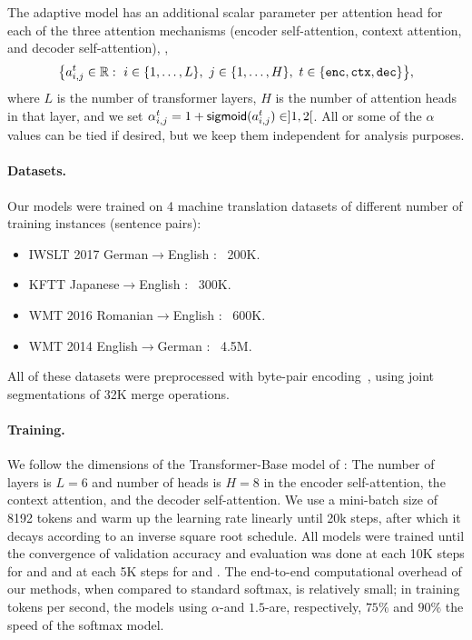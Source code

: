 The adaptive model has an additional scalar parameter per attention
head for each of the three attention mechanisms (encoder
self-attention, context attention, and decoder self-attention), \ie,
\begin{equation}
    \big \{ a_{i,j}^{t} \in \mathbb{R}:~
    i \in \{1, \dots, L\},~
    j \in \{1, \dots, H\},~
    t \in \{\texttt{enc}, \texttt{ctx}, \texttt{dec}\} \big\},
\end{equation}
where $L$ is the number of transformer layers, $H$ is the number of attention heads in that layer,
and we set $\alpha_{i,j}^t = 1 + \operatorname*{\mathsf{sigmoid}}(a_{i,j}^t) \in ]1, 2[$.
All or some of the $\alpha$ values can be tied if desired, but we
keep them independent for analysis purposes.

\paragraph*{Datasets.} Our models were trained on 4 machine
translation datasets of different number of training instances
(sentence pairs):

\begin{itemize}[itemsep=.5ex,leftmargin=2ex]
    \item IWSLT 2017 German$\rightarrow$English
          \citep[,][]{cettolooverview}: ~200K.
    \item KFTT Japanese$\rightarrow$English
          \citep[,][]{neubig11kftt}: ~300K.
    \item WMT 2016 Romanian$\rightarrow$English
          \citep[,][]{bojar2016findings}: ~600K.
    \item WMT 2014 English$\rightarrow$German
          \citep[,][]{bojar2014findings}: ~4.5M.
\end{itemize}

All of these datasets were preprocessed with byte-pair
encoding~\citep[BPE;][]{sennrich2016neural}, using joint
segmentations of 32K merge operations.

\paragraph*{Training.}
We follow the dimensions of the Transformer-Base model of
\citet{vaswani2017attention}: The number of layers is $L=6$ and
number of heads is $H=8$ in the encoder self-attention, the context
attention, and the decoder self-attention. We use a mini-batch size
of 8192 tokens and warm up the learning rate linearly until 20k
steps, after which it decays according to an inverse square root
schedule. All models were trained until the convergence of validation
accuracy and evaluation was done at each 10K steps for
 and  and at each 5K steps for
 and . The end-to-end computational
overhead of our methods, when compared to standard softmax, is
relatively small; in training tokens per second, the models using
$\alpha$-\entmaxtext and $1.5$-\entmaxtext are, respectively, $75\%$
and $90\%$ the speed of the softmax model.

